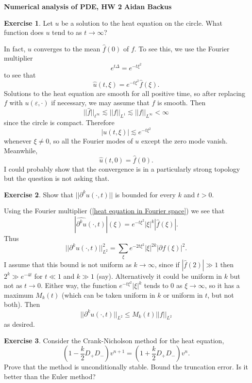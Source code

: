 \documentclass[10pt]{article}
\theoremstyle{definition}
\newtheorem{exer}{Exercise}
\begin{document}
\noindent
\large\textbf{Numerical analysis of PDE, HW 2} \hfill \textbf{Aidan Backus} \\

\begin{exer}
Let $u$ be a solution to the heat equation on the circle.
What function does $u$ tend to as $t \to \infty$?
\end{exer}

In fact, $u$ converges to the mean $\hat f(0)$ of $f$. To see this, we use the Fourier multiplier
$$e^{t\Delta} = e^{-t\xi^2}$$
to see that
\begin{equation}\label{heat equation in Fourier space}
\hat u(t, \xi) = e^{-t\xi^2} \hat f(\xi).
\end{equation}
Solutions to the heat equation are smooth for all positive time, so after replacing $f$ with $u(\varepsilon, \cdot)$ if necessary, we may assume that $f$ is smooth.
Then
$$||\hat f||_{\ell^\infty} \lesssim ||f||_{L^1} \lesssim ||f||_{L^\infty} < \infty$$
since the circle is compact.
Therefore
$$|u(t, \xi)| \lesssim e^{-t\xi^2}$$
whenever $\xi \neq 0$, so all the Fourier modes of $u$ except the zero mode vanish.
Meanwhile,
$$\hat u(t, 0) = \hat f(0).$$
I could probably show that the convergence is in a particularly strong topology but the question is not asking that.

\begin{exer}
Show that $||\partial^k u(\cdot, t)||$ is bounded for every $k$ and $t > 0$.
\end{exer}

Using the Fourier multiplier (\ref{heat equation in Fourier space}) we see that
$$|\widehat{\partial^k u}(\cdot, t)|(\xi) = e^{-t\xi^2} |\xi|^k |\hat f(\xi)|.$$
Thus
$$||\partial^k u(\cdot, t)||_{L^2}^2 = \sum_\xi e^{-2t\xi^2} |\xi|^{2k} |\partial f(\xi)|^2.$$
I assume that this bound is not uniform as $k \to \infty$, since if $|\hat f(2)| \gg 1$ then $2^k \gg e^{-4t}$ for $t \ll 1$ and $k \gg 1$ (say).
Alternatively it could be uniform in $k$ but not as $t \to 0$.
Either way, the function $e^{-t\xi^2} |\xi|^k$ tends to $0$ as $\xi \to \infty$, so it has a maximum $M_k(t)$ (which can be taken uniform in $k$ or uniform in $t$, but not both).
Then
$$||\partial^k u(\cdot, t)||_{L^2} \leq M_k(t) ||f||_{L^2}$$
as desired.

\begin{exer}
Consider the Crank-Nicholson method for the heat equation,
\begin{equation}\label{CrankNicholson}
(1 - \frac{k}{2}D_+D_-)v^{n+1} = (1 + \frac{k}{2}D_+ D_-) v^n.
\end{equation}
Prove that the method is unconditionally stable.
Bound the truncation error.
Is it better than the Euler method?
\end{exer}
\end{document}
